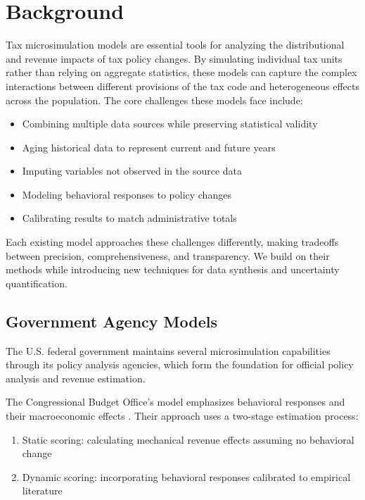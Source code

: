 \section{Background}

Tax microsimulation models are essential tools for analyzing the distributional and revenue impacts of tax policy changes. By simulating individual tax units rather than relying on aggregate statistics, these models can capture the complex interactions between different provisions of the tax code and heterogeneous effects across the population. The core challenges these models face include:

\begin{itemize}
    \item Combining multiple data sources while preserving statistical validity
    \item Aging historical data to represent current and future years
    \item Imputing variables not observed in the source data
    \item Modeling behavioral responses to policy changes
    \item Calibrating results to match administrative totals
\end{itemize}

Each existing model approaches these challenges differently, making tradeoffs between precision, comprehensiveness, and transparency. We build on their methods while introducing new techniques for data synthesis and uncertainty quantification.

\subsection{Government Agency Models}

The U.S. federal government maintains several microsimulation capabilities through its policy analysis agencies, which form the foundation for official policy analysis and revenue estimation.

The Congressional Budget Office's model emphasizes behavioral responses and their macroeconomic effects \cite{cbo2018}. Their approach uses a two-stage estimation process:

\begin{enumerate}
    \item Static scoring: calculating mechanical revenue effects assuming no behavioral change
    \item Dynamic scoring: incorporating behavioral responses calibrated to empirical literature
\end{enumerate}

